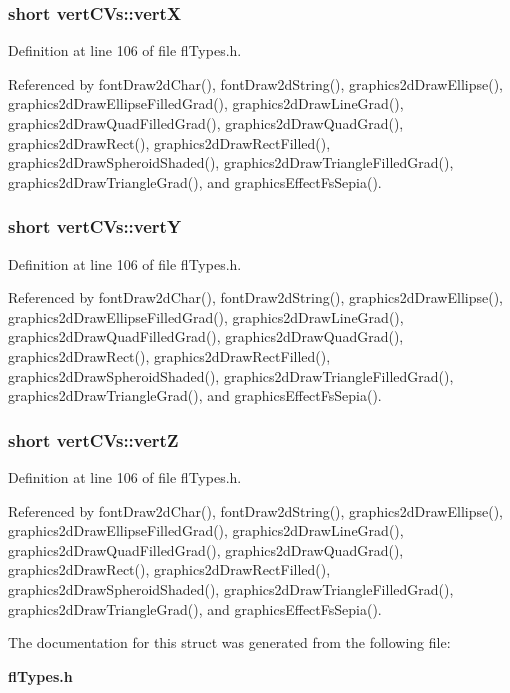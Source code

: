 \subsubsection{\setlength{\rightskip}{0pt plus 5cm}short {\bf vert\-CVs::vert\-X}}\label{structvertCVs_43181117ce1cfb881e63f4f4a0030c39}




Definition at line 106 of file fl\-Types.h.

Referenced by font\-Draw2d\-Char(), font\-Draw2d\-String(), graphics2d\-Draw\-Ellipse(), graphics2d\-Draw\-Ellipse\-Filled\-Grad(), graphics2d\-Draw\-Line\-Grad(), graphics2d\-Draw\-Quad\-Filled\-Grad(), graphics2d\-Draw\-Quad\-Grad(), graphics2d\-Draw\-Rect(), graphics2d\-Draw\-Rect\-Filled(), graphics2d\-Draw\-Spheroid\-Shaded(), graphics2d\-Draw\-Triangle\-Filled\-Grad(), graphics2d\-Draw\-Triangle\-Grad(), and graphics\-Effect\-Fs\-Sepia().
\subsubsection{\setlength{\rightskip}{0pt plus 5cm}short {\bf vert\-CVs::vert\-Y}}\label{structvertCVs_31cfb2bd2877213048566ed2d3e0f5db}




Definition at line 106 of file fl\-Types.h.

Referenced by font\-Draw2d\-Char(), font\-Draw2d\-String(), graphics2d\-Draw\-Ellipse(), graphics2d\-Draw\-Ellipse\-Filled\-Grad(), graphics2d\-Draw\-Line\-Grad(), graphics2d\-Draw\-Quad\-Filled\-Grad(), graphics2d\-Draw\-Quad\-Grad(), graphics2d\-Draw\-Rect(), graphics2d\-Draw\-Rect\-Filled(), graphics2d\-Draw\-Spheroid\-Shaded(), graphics2d\-Draw\-Triangle\-Filled\-Grad(), graphics2d\-Draw\-Triangle\-Grad(), and graphics\-Effect\-Fs\-Sepia().
\subsubsection{\setlength{\rightskip}{0pt plus 5cm}short {\bf vert\-CVs::vert\-Z}}\label{structvertCVs_992c40abe268ad6f078d478665288548}




Definition at line 106 of file fl\-Types.h.

Referenced by font\-Draw2d\-Char(), font\-Draw2d\-String(), graphics2d\-Draw\-Ellipse(), graphics2d\-Draw\-Ellipse\-Filled\-Grad(), graphics2d\-Draw\-Line\-Grad(), graphics2d\-Draw\-Quad\-Filled\-Grad(), graphics2d\-Draw\-Quad\-Grad(), graphics2d\-Draw\-Rect(), graphics2d\-Draw\-Rect\-Filled(), graphics2d\-Draw\-Spheroid\-Shaded(), graphics2d\-Draw\-Triangle\-Filled\-Grad(), graphics2d\-Draw\-Triangle\-Grad(), and graphics\-Effect\-Fs\-Sepia().

The documentation for this struct was generated from the following file:\begin{CompactItemize}
\item 
{\bf fl\-Types.h}\end{CompactItemize}
